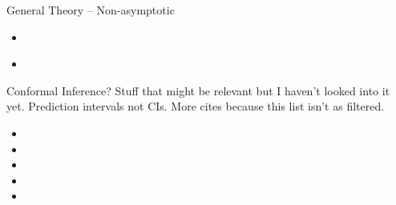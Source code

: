 \documentclass[aspectratio=169, professionalfonts, handout]{beamer}
\begin{document}
\begin{frame}{General Theory -- Non-asymptotic}
	\vfill
	\begin{itemize}
		\item \cite{waudby-smith2022Anytimevalid}
		      \vfill

		      \item\cite{howard2021Timeuniform}
	\end{itemize}
	\vfill

\end{frame}
\begin{frame}{Conformal Inference?}
	Stuff that might be relevant but I haven't looked into it yet.
	Prediction intervals not CIs. More cites because this list isn't
	as filtered.
	\begin{itemize}
		\item {}
		      \vfill
		\item {}
		      \vfill
		\item {}
		      \vfill
		\item {}
		      \vfill
		\item {}
		      \vfill
	\end{itemize}
\end{frame}



\appendix
\printbibliography
\end{document}
